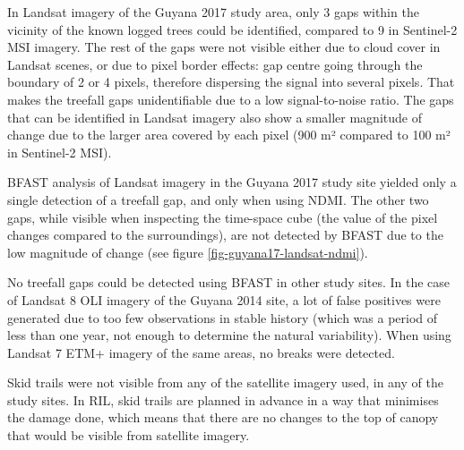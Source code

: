 \documentclass[a4paper,12pt]{scrbook}
\begin{document}
In Landsat imagery of the Guyana 2017 study area, only 3 gaps within the vicinity of the known logged trees could be identified, compared to 9 in Sentinel-2 \ac{MSI} imagery. The rest of the gaps were not visible either due to cloud cover in Landsat scenes, or due to pixel border effects: gap centre going through the boundary of 2 or 4 pixels, therefore dispersing the signal into several pixels. That makes the treefall gaps unidentifiable due to a low signal-to-noise ratio. The gaps that can be identified in Landsat imagery also show a smaller magnitude of change due to the larger area covered by each pixel (900 m² compared to 100 m² in Sentinel-2 \ac{MSI}).

\ac{BFAST} analysis of Landsat imagery in the Guyana 2017 study site yielded only a single detection of a treefall gap, and only when using \ac{NDMI}. The other two gaps, while visible when inspecting the time-space cube (the value of the pixel changes compared to the surroundings), are not detected by \ac{BFAST} due to the low magnitude of change (see figure \ref{fig-guyana17-landsat-ndmi}).

No treefall gaps could be detected using \ac{BFAST} in other study sites. In the case of Landsat 8 \ac{OLI} imagery of the Guyana 2014 site, a lot of false positives were generated due to too few observations in stable history (which was a period of less than one year, not enough to determine the natural variability). When using Landsat 7 \ac{ETM+} imagery of the same areas, no breaks were detected.

Skid trails were not visible from any of the satellite imagery used, in any of the study sites. In \ac{RIL}, skid trails are planned in advance in a way that minimises the damage done, which means that there are no changes to the top of canopy that would be visible from satellite imagery.
\end{document}
